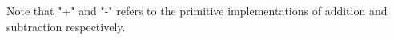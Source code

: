 Note that "+" and "-" refers to the primitive implementations of addition 
and subtraction respectively.

